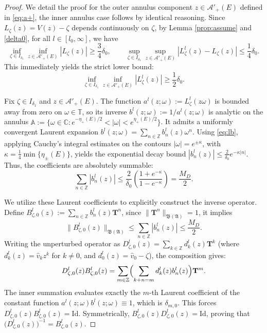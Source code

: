 \documentclass[reqno,11pt]{amsart}
\newcommand{\Z}{{\mathbb Z}}
\newcommand{\T}{{\mathbb T}}
\begin{document}
\begin{proof}
We detail the proof for the outer annulus component  $z\in\mathcal A'_+(E)$ defined in \eqref{eq:a+}, the inner annulus case follows by identical reasoning. Since  $L_{\zeta}^{}(z)=V(z)-\zeta$ depends continuously on $\zeta$, by Lemma \ref{prop:assume} and \eqref{delta0},  for all $l \in [l_0, \infty]$, we have
$$
\inf_{\zeta\in I_{\delta_1}}\inf_{z\in\mathcal A'_+(E)} |L_{\zeta}(z)| \ge \frac{3}{4}\delta_0,
\qquad
\sup_{\zeta\in I_{\delta_1}}\sup_{z\in\mathcal A'_+(E)} |L^{l}_{\zeta}(z)-L_{\zeta}(z)| \le \frac{1}{4}\delta_0.
$$
This immediately yields the strict lower bound:
\begin{equation}\label{eq:lb}
\inf_{\zeta\in I_{\delta_1}}\inf_{z\in\mathcal A'_+(E)} |L^{l}_{\zeta}(z)| \ge \frac{1}{2}\delta_0.
\end{equation}

Fix $\zeta\in I_{\delta_1}$ and $z\in\mathcal{A}'_+(E)$. The function $a^{l}(z;\omega):=L^{l}_{\zeta}(z\omega)$ is bounded away from zero on $\omega\in \T$, so its inverse $b^{l}(z;\omega):=1/a^{l}(z;\omega)$ is analytic on the  annulus $\mathbb A:=\{\omega\in\mathbb C:  e^{-\eta_+(E)/2}< |\omega|<  e^{\eta_+(E)/2}\}$. It admits a uniformly convergent Laurent expansion $b^{l}(z;\omega)=\sum_{n\in\Z} b^{l}_n(z) \omega^n$. Using \eqref{eq:lb},
applying Cauchy's integral estimates on the contours $|\omega| = e^{\pm \kappa}$, with $\kappa = \frac{1}{4}\min\{\eta_\pm(E)\}$, yields the exponential decay bound $|b^{l}_n(z)|\le \frac{2}{\delta_0} e^{-\kappa |n|}$. Thus, the coefficients are absolutely summable:
$$
\sum_{n\in\Z}|b^{l}_n(z)| \le \frac{2}{\delta_0} \left( \frac{1+e^{-\kappa}}{1-e^{-\kappa}} \right) = \frac{M_D}{2}.
$$

We utilize these Laurent coefficients to explicitly construct the inverse operator. Define $B_{\zeta,0}^{l}(z):=\sum_{n\in\Z} b^{l}_n(z) \mathbf T^n$, since $\|\mathbf T^n\|_{\mathfrak{B}(\mathfrak A)}=1$, it implies 
$$
\|B_{\zeta,0}^{l}(z)\|_{\mathfrak{B}(\mathfrak A)} \le \sum_{n\in\Z}|b^{l}_n(z)| \le \frac{M_D}{2}.
$$
Writing the unperturbed operator as $D_{\zeta,0}^{l}(z)=\sum_{k\in\Z} d_k^{l}(z) \mathbf T^k$ (where $d_k^{l}(z)=\hat{v}_k z^k$ for $k\neq 0$, and $d_0^{l}(z)=\hat{v}_0-\zeta$), the composition gives:
$$
D_{\zeta,0}^{l}(z)B_{\zeta,0}^{l}(z) = \sum_{m\in\Z} \Bigl( \sum_{k+n=m} d_k^{l}(z)b^{l}_n(z) \Bigr) \mathbf T^m.
$$
The inner summation evaluates exactly the $m$-th Laurent coefficient of the constant function $a^{l}(z;\omega)b^{l}(z;\omega) \equiv 1$, which is $\delta_{m,0}$. This forces $D_{\zeta,0}^{l}(z)B_{\zeta,0}^{l}(z)=\mathrm{Id}$. Symmetrically, $B_{\zeta,0}^{l}(z) D_{\zeta,0}^{l}(z)=\mathrm{Id}$, proving that $\bigl(D_{\zeta,0}^{l}(z)\bigr)^{-1} = B_{\zeta,0}^{l}(z)$.


\end{proof}
\end{document}
